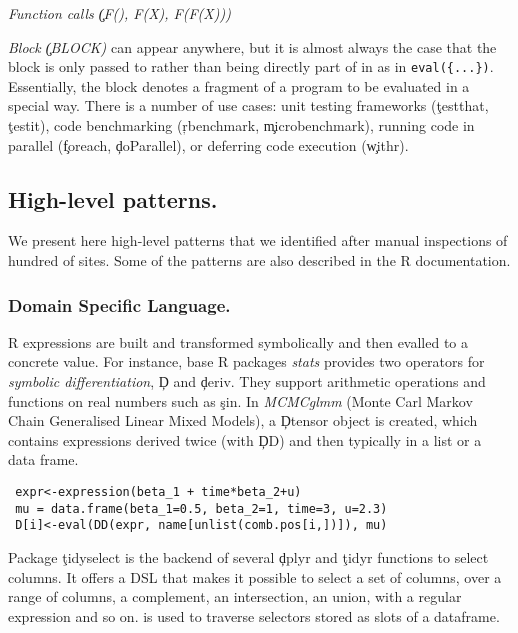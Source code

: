 \documentclass[review,screen,acmsmall,anonymous=true]{acmart}
\begin{document}
\begin{compactitem}[---]
  \item \emph{Function calls \c{(F(), F(X), F(F(X)))}} 


  \item \emph{Block \c{(BLOCK)}} can appear anywhere, but it is almost always
    the case that the block is only passed to \eval rather than being directly
    part of in as in \lstinline|eval({...})|. Essentially, the block denotes a fragment
    of a program to be evaluated in a special way. There is a number of use
    cases: unit testing frameworks (\eg \c{testthat}, \c{testit}), code
    benchmarking (\eg \c{rbenchmark}, \c{microbenchmark}), running code in
    parallel (\eg \c{foreach}, \c{doParallel}), or deferring code execution
    (\eg \c{withr}). 


\end{compactitem}

\subsection{High-level patterns.}

We present here high-level patterns that we identified after manual inspections of hundred of \eval sites. Some of the patterns are also described in the R documentation.

\subsubsection{Domain Specific Language.} R expressions are built and transformed symbolically and then evalled to a concrete value. For instance,   base R packages \emph{stats} provides two operators for \emph{symbolic differentiation}, \c{D} and \c{deriv}. They support arithmetic operations and functions on real numbers such as \c{sin}.
In \emph{MCMCglmm} (Monte Carl Markov Chain Generalised Linear Mixed Models), a \c{Dtensor} object is created, which contains expressions derived twice (with \c{DD}) and then typically in a list or a data frame.
\begin{lstlisting}
 expr<-expression(beta_1 + time*beta_2+u)
 mu = data.frame(beta_1=0.5, beta_2=1, time=3, u=2.3)
 D[i]<-eval(DD(expr, name[unlist(comb.pos[i,])]), mu)
\end{lstlisting}

Package \c{tidyselect} is the backend of several \c{dplyr} and \c{tidyr} functions to select columns. It offers a DSL that makes it possible to select a set of columns, over a range of columns, a complement, an intersection, an union, with a regular expression and so on. \eval is used to traverse selectors stored as slots of a dataframe.
\end{document}
